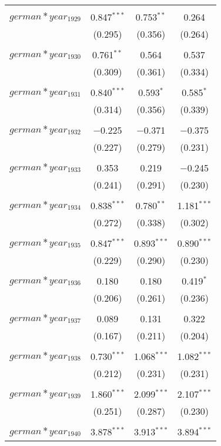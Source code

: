 \begin{table}[!htbp]
\begin{tabular}{@{\extracolsep{5pt}}lccc}
  & & & \\ 
 $german*year_1929$ & 0.847$^{***}$ & 0.753$^{**}$ & 0.264 \\ 
  & (0.295) & (0.356) & (0.264) \\ 
  & & & \\ 
 $german*year_1930$ & 0.761$^{**}$ & 0.564 & 0.537 \\ 
  & (0.309) & (0.361) & (0.334) \\ 
  & & & \\ 
 $german*year_1931$ & 0.840$^{***}$ & 0.593$^{*}$ & 0.585$^{*}$ \\ 
  & (0.314) & (0.356) & (0.339) \\ 
  & & & \\ 
 $german*year_1932$ & $-$0.225 & $-$0.371 & $-$0.375 \\ 
  & (0.227) & (0.279) & (0.231) \\ 
  & & & \\ 
 $german*year_1933$ & 0.353 & 0.219 & $-$0.245 \\ 
  & (0.241) & (0.291) & (0.230) \\ 
  & & & \\ 
 $german*year_1934$ & 0.838$^{***}$ & 0.780$^{**}$ & 1.181$^{***}$ \\ 
  & (0.272) & (0.338) & (0.302) \\ 
  & & & \\ 
 $german*year_1935$ & 0.847$^{***}$ & 0.893$^{***}$ & 0.890$^{***}$ \\ 
  & (0.229) & (0.290) & (0.230) \\ 
  & & & \\ 
 $german*year_1936$ & 0.180 & 0.180 & 0.419$^{*}$ \\ 
  & (0.206) & (0.261) & (0.236) \\ 
  & & & \\ 
 $german*year_1937$ & 0.089 & 0.131 & 0.322 \\ 
  & (0.167) & (0.211) & (0.204) \\ 
  & & & \\ 
 $german*year_1938$ & 0.730$^{***}$ & 1.068$^{***}$ & 1.082$^{***}$ \\ 
  & (0.212) & (0.231) & (0.231) \\ 
  & & & \\ 
 $german*year_1939$ & 1.860$^{***}$ & 2.099$^{***}$ & 2.107$^{***}$ \\ 
  & (0.251) & (0.287) & (0.230) \\ 
  & & & \\ 
 $german*year_1940$ & 3.878$^{***}$ & 3.913$^{***}$ & 3.894$^{***}$ \\ 

\end{tabular}
\end{table}
